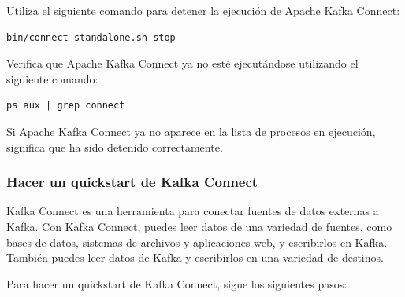 \documentclass{article}
\begin{document}
\begin{itemize}
    Utiliza el siguiente comando para detener la ejecución de Apache Kafka Connect:
    \begin{lstlisting}[numbers=none]
bin/connect-standalone.sh stop\end{lstlisting}
Verifica que Apache Kafka Connect ya no esté ejecutándose utilizando el siguiente comando:
    \begin{lstlisting}[numbers=none]
ps aux | grep connect\end{lstlisting}
    Si Apache Kafka Connect ya no aparece en la lista de procesos en ejecución, significa que ha sido detenido correctamente.
\end{itemize}
\subsubsection{Hacer un quickstart de Kafka Connect}

Kafka Connect es una herramienta para conectar fuentes de datos externas a Kafka. Con Kafka Connect, puedes leer datos de una variedad de fuentes, como bases de datos, sistemas de archivos y aplicaciones web, y escribirlos en Kafka. También puedes leer datos de Kafka y escribirlos en una variedad de destinos.

Para hacer un quickstart de Kafka Connect, sigue los siguientes pasos:
\end{document}
